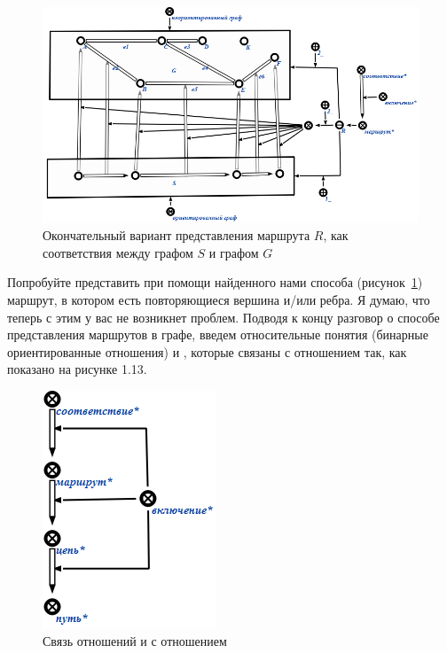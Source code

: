 \begin{figure}[h!]
  \centering
  \includegraphics[scale=0.6]{images/2/Route_as_correspondence_Final}
  \caption{Окончательный вариант представления маршрута $R$, как
    соответствия между графом $S$ и графом $G$}
  \label{fig:Route_as_correspondence_Final}
\end{figure}

Попробуйте представить при помощи найденного нами способа
(рисунок~\ref{fig:Route_as_correspondence_Final}) маршрут, в котором
есть повторяющиеся вершина и/или ребра. Я думаю, что теперь с этим у
вас не возникнет проблем. Подводя к концу разговор о способе
представления маршрутов в графе, введем относительные понятия
(бинарные ориентированные отношения)  и , которые
связаны с отношением  так, как показано на рисунке 1.13.

\begin{figure}[h!]
  \centering
  \includegraphics[scale=0.8]{images/2/Relations_Trail_and_Path}
  \caption{Связь отношений  и  с отношением
    }
  \label{fig:Relations_Trail_and_Path}
\end{figure}

